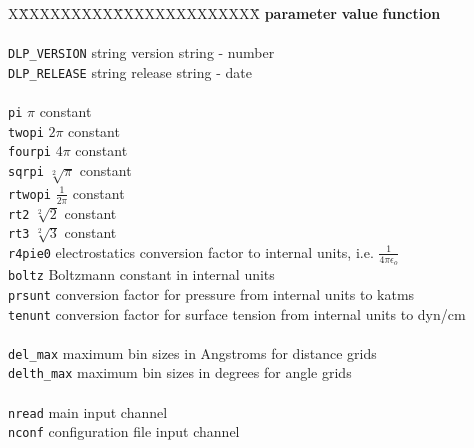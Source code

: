 \begin{tabbing}
X\=XXXXXXXXX\=XXXXXXXXXXXXXX\=\kill
\> {\bf parameter}   \> {\bf value}          \> {\bf function} \\
\>                   \>                      \> \\
\> {\tt DLP\_VERSION}\> string               \> version string - number \\
\> {\tt DLP\_RELEASE}\> string               \> release string - date \\
\>                   \>                      \> \\
\> {\tt pi}            \> $\pi$ constant \\
\> {\tt twopi}         \> $2 \pi$ constant \\
\> {\tt fourpi}       \> $4 \pi$ constant \\
\> {\tt sqrpi}           \> $\sqrt[2]{\pi}$ constant \\
\> {\tt rtwopi}        \> $\frac{1}{2 \pi}$ constant \\
\> {\tt rt2}           \> $\sqrt[2]{2}$ constant \\
\> {\tt rt3}           \> $\sqrt[2]{3}$ constant \\
\> {\tt r4pie0}                \> electrostatics conversion factor to internal units, i.e. $\frac{1}{4 \pi \epsilon_{o}}$ \\
\> {\tt boltz}                 \> Boltzmann constant in internal units \\
\> {\tt prsunt}                \> conversion factor for pressure from internal units to katms \\
\> {\tt tenunt}                \> conversion factor for surface tension from internal units to dyn/cm \\
\>                   \>                      \> \\
\> {\tt del\_max}                     \>  maximum bin sizes in Angstroms for distance grids \\
\> {\tt delth\_max}                   \>  maximum bin sizes in degrees for angle grids \\
\>                   \>                      \> \\
\> {\tt nread}                           \> main input channel \\
\> {\tt nconf}                          \> configuration file input channel \\

\end{tabbing}
